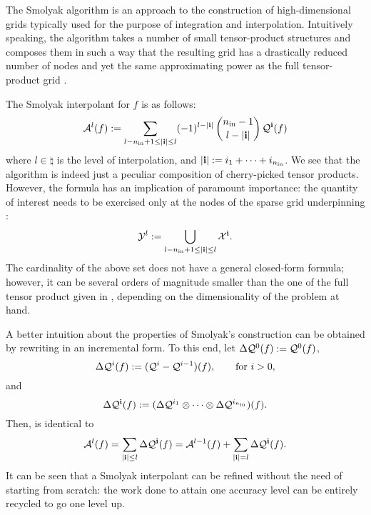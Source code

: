 The Smolyak algorithm is an approach to the construction of high-dimensional
grids typically used for the purpose of integration and interpolation.
Intuitively speaking, the algorithm takes a number of small tensor-product
structures and composes them in such a way that the resulting grid has a
drastically reduced number of nodes and yet the same approximating power as the
full tensor-product grid \cite{klimke2006}.

The Smolyak interpolant for $f$ is as follows:
\begin{equation} \elab{smolyak}
  \smolyak{l}(f) := \sum_{l - \nin + 1 \leq |\vi| \leq l} (-1)^{l - |\vi|} \, {\nin - 1 \choose l - |\vi|} \, \tensor{\vi}(f)
\end{equation}
where $l \in \natural$ is the level of interpolation, and $|\mathbf{i}| := i_1 + \dots
+ i_{n_\text{in}}$. We see that the algorithm is indeed just a peculiar composition of
cherry-picked tensor products. However, the formula has an implication of
paramount importance: the quantity of interest needs to be exercised only at the
nodes of the sparse grid underpinning :
\begin{equation} \elab{smolyak-grid}
  \Y^l := \bigcup_{l - \nin + 1 \leq |\vi| \leq l} \X^\vi.
\end{equation}
The cardinality of the above set does not have a general closed-form formula;
however, it can be several orders of magnitude smaller than the one of the full
tensor product given in , depending on the
dimensionality of the problem at hand.

A better intuition about the properties of Smolyak's construction can be
obtained by rewriting  in an incremental form. To this end, let
$\Delta\mathcal{Q}^{0}(f) := \mathcal{Q}^{0}(f)$,
\begin{equation} \elab{tensor-delta-1d}
  \Delta\tensor{i}(f) := (\tensor{i} - \tensor{i - 1})(f), \qquad \text{for $i > 0$},
\end{equation}
and
\[
  \Delta\mathcal{Q}^{\mathbf{i}}(f) := (\Delta\mathcal{Q}^{i_1} \otimes \cdots \otimes \Delta\mathcal{Q}^{i_{n_\text{in}}})(f).
\]
Then,  is identical to
\begin{equation} \elab{smolyak-incremental}
  \smolyak{l}(f) = \sum_{|\vi| \leq l} \Delta\tensor{\vi}(f) = \smolyak{l - 1}(f) + \sum_{|\vi| = l} \Delta\tensor{\vi}(f).
\end{equation}
It can be seen that a Smolyak interpolant can be refined without the need of
starting from scratch: the work done to attain one accuracy level can be
entirely recycled to go one level up.

